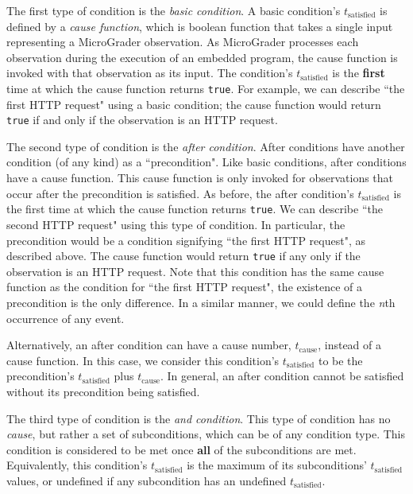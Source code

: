 \documentclass[12pt]{article}
\begin{document}
The first type of condition is the \textit{basic condition}.  A basic condition's $t_{\text{satisfied}}$ is defined by a \textit{cause function}, which is boolean function that takes a single input representing a MicroGrader observation.  As MicroGrader processes each observation during the execution of an embedded program, the cause function is invoked with that observation as its input.  The condition's $t_{\text{satisfied}}$ is the \textbf{first} time at which the cause function returns \texttt{true}.  For example, we can describe ``the first HTTP request" using a basic condition; the cause function would return \texttt{true} if and only if the observation is an HTTP request.

The second type of condition is the \textit{after condition}.  After conditions have another condition (of any kind) as a ``precondition".  Like basic conditions, after conditions have a cause function.  This cause function is only invoked for observations that occur after the precondition is satisfied.  As before, the after condition's $t_{\text{satisfied}}$ is the first time at which the cause function returns \texttt{true}.  We can describe ``the second HTTP request" using this type of condition.  In particular, the precondition would be a condition signifying ``the first HTTP request", as described above.  The cause function would return \texttt{true} if any only if the observation is an HTTP request.  Note that this condition has the same cause function as the condition for ``the first HTTP request", the existence of a precondition is the only difference.  In a similar manner, we could define the \textit{n}th occurrence of any event.

Alternatively, an after condition can have a cause number, $t_{\text{cause}}$, instead of a cause function.  In this case, we consider this condition's $t_{\text{satisfied}}$ to be the precondition's $t_{\text{satisfied}}$ plus $t_{\text{cause}}$.  In general, an after condition cannot be satisfied without its precondition being satisfied.

The third type of condition is the \textit{and condition}.  This type of condition has no \textit{cause}, but rather a set of subconditions, which can be of any condition type.  This condition is considered to be met once \textbf{all} of the subconditions are met.  Equivalently, this condition's $t_{\text{satisfied}}$ is the maximum of its subconditions' $t_{\text{satisfied}}$ values, or undefined if any subcondition has an undefined $t_{\text{satisfied}}$.
\end{document}

